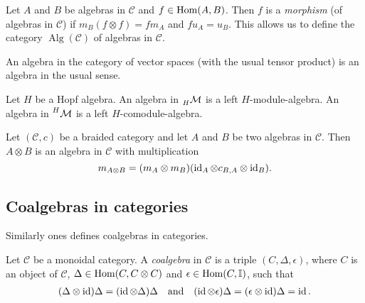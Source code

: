 \documentclass[12pt]{amsproc}
\newcommand{\lmod}[1]{\prescript{}{#1}{\mathcal{M}}}
\newcommand{\lcomod}[1]{\prescript{#1}{}{\mathcal{M}}}
\begin{document}
Let $A$ and $B$ be algebras in $\mathcal{C}$ and $f\in\operatorname{Hom}(A,B)$.
Then $f$ is a \emph{morphism} (of algebras in $\mathcal{C}$)
if $m_{B}(f\otimes f)=fm_{A}$ and $fu_{A}=u_{B}$. This allows
us to define the category $\operatorname{Alg}(\mathcal{C})$
of algebras in $\mathcal{C}$. 

\begin{example}
An algebra in the category of vector spaces (with the usual tensor product) is an algebra in
the usual sense.
\end{example}

\begin{example}
Let $H$ be a Hopf algebra. An algebra in $\lmod{H}$ is a left $H$-module-algebra. 
An algebra in $\lcomod{H}$ 
is a left 
$H$-comodule-algebra.
\end{example}




\begin{example}
Let $(\mathcal{C},c)$ be a braided category and let $A$ and $B$ be two algebras
in $\mathcal{C}$. Then $A\otimes B$ is an algebra in $\mathcal{C}$ with
multiplication 
\[
m_{A\otimes B}=(m_A\otimes m_B)(\operatorname{id}_A\otimes c_{B,A}\otimes \operatorname{id}_B).
\]
\end{example}

\subsection{Coalgebras in categories}
Similarly ones defines coalgebras in categories.

\begin{definition}
Let $\mathcal{C}$ be a monoidal category. A \emph{coalgebra}
in $\mathcal{C}$ is a triple $(C,\Delta,\epsilon)$, where
$C$ is an object of $\mathcal{C}$, $\Delta\in\operatorname{Hom}(C,C\otimes C)$
and $\epsilon\in\operatorname{Hom}(C,\mathbb{I})$, such that 
\begin{gather*}
(\Delta\otimes\operatorname{id})\Delta=(\operatorname{id}\otimes\Delta)\Delta\quad\text{and}\quad 
(\operatorname{id}\otimes\epsilon)\Delta=(\epsilon\otimes\operatorname{id})\Delta=\operatorname{id}.
\end{gather*}
\end{definition}
\end{document}
